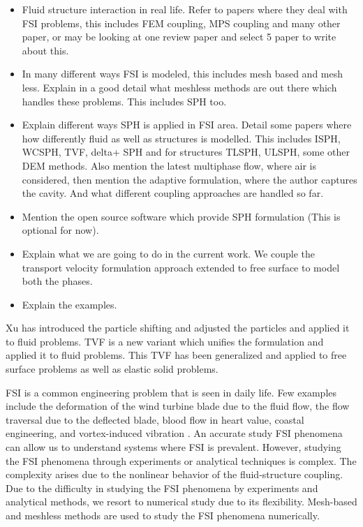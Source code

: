 \documentclass[preprint,12pt]{elsarticle}
\begin{document}
\begin{itemize}
\item Fluid structure interaction in real life. Refer to papers where they deal
  with FSI problems, this includes FEM coupling, MPS coupling and many other
  paper, or may be looking at one review paper and select 5 paper to write about this.
\item In many different ways FSI is modeled, this includes mesh based and mesh
  less. Explain in a good detail what meshless methods are out there which
  handles these problems. This includes SPH too.
\item Explain different ways SPH is applied in FSI area. Detail some papers
  where how differently fluid as well as structures is modelled. This includes
  ISPH, WCSPH, TVF, delta+ SPH and for structures TLSPH, ULSPH, some other DEM
  methods. Also mention the latest multiphase flow, where air is considered,
  then mention the adaptive formulation, where the author captures the cavity.
  And what different coupling approaches are handled so far.
\item Mention the open source software which provide SPH formulation (This is
  optional for now).
\item Explain what we are going to do in the current work. We couple the
  transport velocity formulation approach extended to free surface to model
  both the phases.
\item Explain the examples.
\end{itemize}

Xu has introduced the particle shifting and adjusted the particles and applied
it to fluid problems. TVF is a new variant which unifies the formulation and
applied it to fluid problems. This TVF has been generalized and applied to free
surface problems as well as elastic solid problems.

FSI is a common engineering problem that is seen in daily life. Few examples
include the deformation of the wind turbine blade due to the fluid flow, the
flow traversal due to the deflected blade, blood flow in heart value, coastal
engineering, and vortex-induced vibration
\cite{williamson2004vortex,bearman2011circular}. An accurate study FSI
phenomena can allow us to understand systems where FSI is prevalent. However,
studying the FSI phenomena through experiments or analytical techniques is
complex. The complexity arises due to the nonlinear behavior of the
fluid-structure coupling. Due to the difficulty in studying the FSI phenomena by
experiments and analytical methods, we resort to numerical study due to its
flexibility. Mesh-based and meshless methods are used to study the FSI phenomena
numerically.
\end{document}
